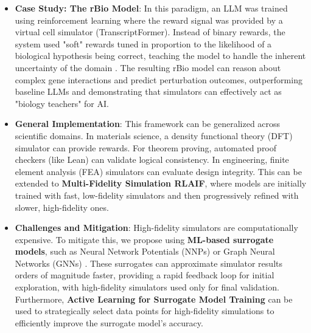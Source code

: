 \documentclass{article}
\begin{document}
\begin{itemize}
    \item \textbf{Case Study: The rBio Model}: In this paradigm, an LLM was trained using reinforcement learning where the reward signal was provided by a virtual cell simulator (TranscriptFormer). Instead of binary rewards, the system used "soft" rewards tuned in proportion to the likelihood of a biological hypothesis being correct, teaching the model to handle the inherent uncertainty of the domain \cite{cziblog2025rbio}. The resulting rBio model can reason about complex gene interactions and predict perturbation outcomes, outperforming baseline LLMs and demonstrating that simulators can effectively act as "biology teachers" for AI.
    \item \textbf{General Implementation}: This framework can be generalized across scientific domains. In materials science, a density functional theory (DFT) simulator can provide rewards. For theorem proving, automated proof checkers (like Lean) can validate logical consistency. In engineering, finite element analysis (FEA) simulators can evaluate design integrity. This can be extended to \textbf{Multi-Fidelity Simulation RLAIF}, where models are initially trained with fast, low-fidelity simulators and then progressively refined with slower, high-fidelity ones.
    \item \textbf{Challenges and Mitigation}: High-fidelity simulators are computationally expensive. To mitigate this, we propose using \textbf{ML-based surrogate models}, such as Neural Network Potentials (NNPs) \cite{behler2007generalized} or Graph Neural Networks (GNNs) \cite{gilmer2017neural}. These surrogates can approximate simulator results orders of magnitude faster, providing a rapid feedback loop for initial exploration, with high-fidelity simulators used only for final validation. Furthermore, \textbf{Active Learning for Surrogate Model Training} can be used to strategically select data points for high-fidelity simulations to efficiently improve the surrogate model's accuracy.
\end{itemize}
\end{document}
